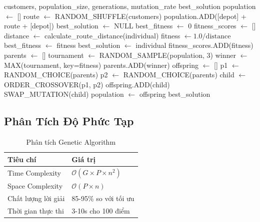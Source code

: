 \documentclass[12pt,a4paper,openany,oneside]{report}
\newcommand{\bigO}{\mathcal{O}}
\begin{document}
\begin{algorithm}
\caption{Genetic Algorithm for VRP}
\begin{algorithmic}[1]
\REQUIRE customers, population\_size, generations, mutation\_rate
\ENSURE best\_solution
\STATE population $\leftarrow$ []
    \STATE route $\leftarrow$ RANDOM\_SHUFFLE(customers)
    \STATE population.ADD([depot] + route + [depot])
\ENDFOR
\STATE best\_solution $\leftarrow$ NULL
\STATE best\_fitness $\leftarrow$ 0
    \STATE fitness\_scores $\leftarrow$ []
        \STATE distance $\leftarrow$ calculate\_route\_distance(individual)
        \STATE fitness $\leftarrow 1.0 / \text{distance}$
            \STATE best\_fitness $\leftarrow$ fitness
            \STATE best\_solution $\leftarrow$ individual
        \ENDIF
        \STATE fitness\_scores.ADD(fitness)
    \ENDFOR
    \STATE parents $\leftarrow$ []
        \STATE tournament $\leftarrow$ RANDOM\_SAMPLE(population, 3)
        \STATE winner $\leftarrow$ MAX(tournament, key=fitness)
        \STATE parents.ADD(winner)
    \ENDFOR
    \STATE offspring $\leftarrow$ []
        \STATE p1 $\leftarrow$ RANDOM\_CHOICE(parents)
        \STATE p2 $\leftarrow$ RANDOM\_CHOICE(parents)
        \STATE child $\leftarrow$ ORDER\_CROSSOVER(p1, p2)
        \STATE offspring.ADD(child)
    \ENDWHILE
            \STATE SWAP\_MUTATION(child)
        \ENDIF
    \ENDFOR
    \STATE population $\leftarrow$ offspring
\ENDFOR
\RETURN best\_solution
\end{algorithmic}
\end{algorithm}

\subsection{Phân Tích Độ Phức Tạp}

\begin{table}[h]
\centering
\caption{Phân tích Genetic Algorithm}
\begin{tabular}{@{}ll@{}}
\toprule
\textbf{Tiêu chí} & \textbf{Giá trị} \\
\midrule
Time Complexity & $\bigO(G \times P \times n^2)$ \\
Space Complexity & $\bigO(P \times n)$ \\
Chất lượng lời giải & 85-95\% so với tối ưu \\
Thời gian thực thi & 3-10s cho 100 điểm \\
\bottomrule
\end{tabular}
\end{table}
\end{document}
